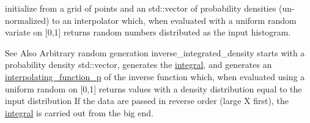 initialize from a grid of points and an std\-::vector of probability densities (un-\/normalized) to an interpolator which, when evaluated with a uniform random variate on \mbox{[}0,1\mbox{]} returns random numbers distributed as the input histogram. 

\begin{DoxySeeAlso}{See Also}
Arbitrary random generation inverse\-\_\-integrated\-\_\-density starts with a probability density std\-::vector, generates the \hyperlink{classc2__function_a675c5056562332be2e49b38485d322b7}{integral}, and generates an \hyperlink{classinterpolating__function__p}{interpolating\-\_\-function\-\_\-p} of the inverse function which, when evaluated using a uniform random on \mbox{[}0,1\mbox{]} returns values with a density distribution equal to the input distribution If the data are passed in reverse order (large X first), the \hyperlink{classc2__function_a675c5056562332be2e49b38485d322b7}{integral} is carried out from the big end. 
\end{DoxySeeAlso}

